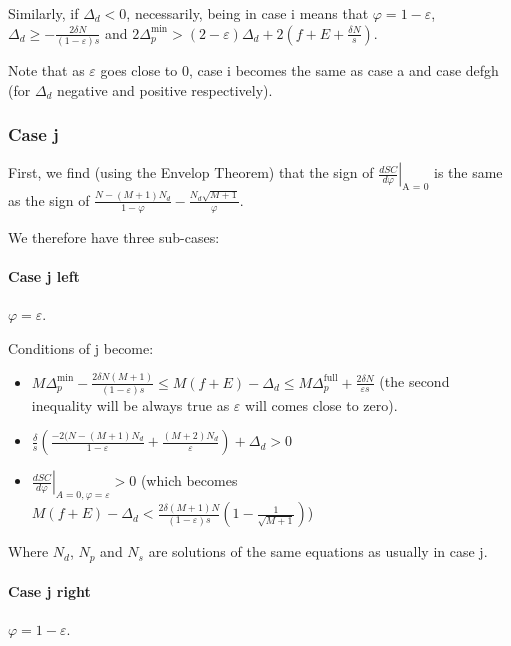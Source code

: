 \documentclass[english, a4paper]{article}
\theoremstyle{plain}
\theoremstyle{definition}
\theoremstyle{remark}
\begin{document}
    Similarly, if $\Delta_d < 0$, necessarily, being in case i means that $\varphi = 1 - \varepsilon$, $\Delta_d \geq -\frac{2\delta N}{(1 - \varepsilon) s}$ and $2\Delta_p^{\text{min}} > (2 - \varepsilon)\Delta_d + 2(f + E + \frac{\delta N}{s})$.

    Note that as $\varepsilon$ goes close to $0$, case i becomes the same as case a and case defgh (for $\Delta_d$ negative and positive respectively).


    \subsubsection{Case j}

    First, we find (using the Envelop Theorem) that the sign of $\left. \frac{dSC}{d\varphi}\right|_{\text{A = 0}}$ is the same as the sign of $\frac{N - (M + 1)N_d}{1 - \varphi} - \frac{N_d \sqrt{M + 1}}{\varphi}$.

    We therefore have three sub-cases:
    
    \paragraph{Case j left} $\varphi = \varepsilon$.

    Conditions of j become:
    \begin{itemize}
        \item $M \Delta_p^{\text{min}} - \frac{2 \delta N (M+1)}{(1 - \varepsilon)s} \leq M(f + E) - \Delta_d \leq M\Delta_p^{\text{full}} + \frac{2\delta N}{\varepsilon s}$ (the second inequality will be always true as $\varepsilon$ will comes close to zero).
        \item $\frac{\delta}{s} \left(\frac{-2(N - (M + 1)N_d}{1 - \varepsilon} + \frac{(M + 2)N_d}{\varepsilon} \right) + \Delta_d > 0$
        \item $\left. \frac{dSC}{d\varphi}\right|_{A = 0, \varphi = \varepsilon} > 0$ (which becomes $M(f + E) - \Delta_d < \frac{2\delta (M+1) N}{(1 - \varepsilon)s} \left( 1 - \frac{1}{\sqrt{M + 1}} \right)$)
    \end{itemize}

    Where $N_d$, $N_p$ and $N_s$ are solutions of the same equations as usually in case j.

    \paragraph{Case j right} $\varphi = 1 - \varepsilon$.
\end{document}
